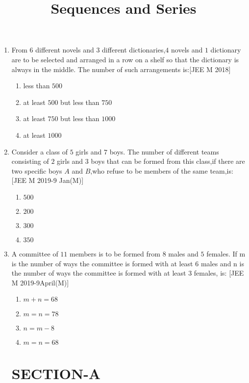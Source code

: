 \documentclass[journal,12pt,onecolumn]{IEEEtran}
\theoremstyle{remark}
\begin{document}
\begin{enumerate}
	\item From $6$ different novels and $3$ different dictionaries,$4$ novels and $1$ dictionary are to be selected and arranged in a row on a shelf so that  the dictionary is always in the middle. The number of such arrangements is:\hfill{[JEE M 2018]}
 \begin{enumerate}
     \item less than $500$ 
     \item at least $500$ but less than $750$
     \item at least $750$ but less than $1000$
     \item at least $1000$
     \end{enumerate}

	\item Consider a class of $5$ girls and $7$ boys. The number of different teams consisting of $2$ girls and $3$ boys that can be formed from this class,if there are two specific boys $A$ and $B$,who refuse to be members of the same team,is:\hfill{[JEE M 2019-9 Jan(M)]}
\begin{enumerate}
    \item $500$  
    \item $200$
    \item $300$
    \item $350$
    \end{enumerate}

	\item A committee of $11$ members is to be formed from $8$ males and $5$ females. If m is the number of ways the committee is formed with at least $6$ males and n is the number of ways the committee is formed with at least $3$ females, is:
    \hfill{[JEE M 2019-9April(M)]}
\begin{enumerate}
      \item $m+n=68$ 
      \item $m=n=78$
      \item $n=m-8$
      \item $m=n=68$
  \end{enumerate}  

\newpage 
\title{ Sequences and Series}
\maketitle
\section{SECTION-A}


\end{enumerate}
\end{document}
